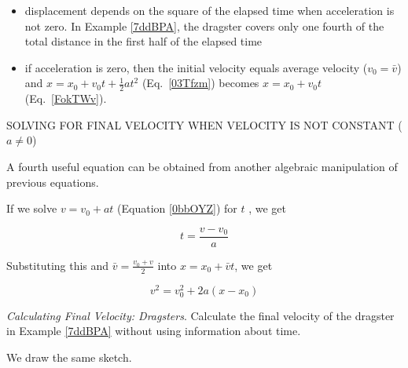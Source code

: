 \documentclass[../../main-ap-physics.tex]{subfiles}
\begin{document}
\begin{itemize}
    \item displacement depends on the square of the elapsed time when acceleration is not zero. In Example \ref{7ddBPA}, the dragster covers only one fourth of the total distance in the first half of the elapsed time
    \item if acceleration is zero, then the initial velocity equals average velocity ($v_0 = \bar{v}$) and $x = x_0 + v_0 t + \frac{1}{2} a t^2$ (Eq.~\ref{03Tfzm}) becomes $x = x_0 + v_0 t$ (Eq.~\ref{FokTWv}).
\end{itemize}

\begin{gradient}{SOLVING FOR FINAL VELOCITY WHEN VELOCITY IS NOT CONSTANT ($a \neq 0 $)}

A fourth useful equation can be obtained from another algebraic manipulation of previous equations.

\vspace{1em}

If we solve $v = v_0 + a t$ (Equation \ref{0bbOYZ}) for $t$ , we get

\begin{equation*}
    t = \frac{v - v_0}{a} 
\end{equation*}

Substituting this and $\bar{v} = \frac{v_0 + v}{2}$ into $x = x_0 + \bar{v} t$, we get 

\begin{equation} \label{jIcda3}
    v^2 = v_0^2 + 2 a (x-x_0)
\end{equation}

\end{gradient}

\begin{example}
    \textit{Calculating Final Velocity: Dragsters}. Calculate the final velocity of the dragster in Example \ref{7ddBPA} without using information about time.
\end{example}

\Solution We draw the same sketch.

\begin{center}
\end{center}
\end{document}
